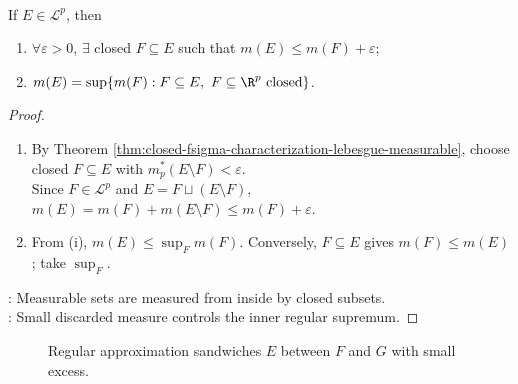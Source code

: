 \begin{corollary} \label{cor:closed-inner-regularity-lebesgue-measure} \\
If $E\in\mathcal{L}^p$, then
\begin{enumerate}[label=(\roman*)]
\setlength{\itemsep}{0pt}
\item $\forall\varepsilon>0$, $\exists$ closed $F\subseteq E$ such that $m(E)\leq m(F)+\varepsilon$;
\item $m(E)=\sup\{m(F):F\subseteq E,\ F\subseteq\R^p\text{ closed}\}$.
\end{enumerate}
\begin{proof}
\begin{enumerate}[label=(\roman*)]
\setlength{\itemsep}{0pt}
\item By Theorem \ref{thm:closed-fsigma-characterization-lebesgue-measurable}, choose closed $F\subseteq E$ with $m_p^\ast(E\setminus F)<\varepsilon$.\\
Since $F\in\mathcal{L}^p$ and $E=F\sqcup(E\setminus F)$, $m(E)=m(F)+m(E\setminus F)\leq m(F)+\varepsilon$.
\item From (i), $m(E)\leq\sup_Fm(F)$. Conversely, $F\subseteq E$ gives $m(F)\leq m(E)$; take $\sup_F$.
\end{enumerate}
: Measurable sets are measured from inside by closed subsets.\\
: Small discarded measure controls the inner regular supremum.
\end{proof}
\end{corollary}

\begin{figure}[H]
  \centering
  
  \caption{Regular approximation sandwiches $E$ between $F$ and $G$ with small excess.}
  \label{fig:regular-approximation-sandwich}
\end{figure}

